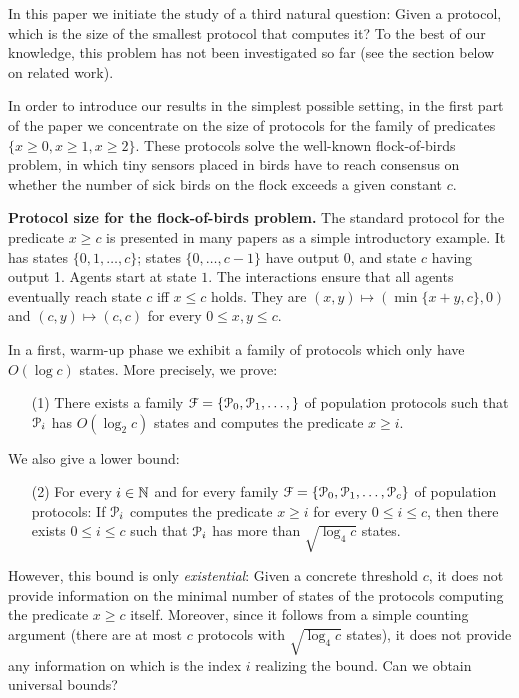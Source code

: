 In this paper we initiate the study of a third natural question: Given
a protocol, which is the size of the smallest protocol that computes
it? To the best of our knowledge, this problem has not been
investigated so far (see the section below on related work).

In order to introduce our results in the simplest possible setting, in
the first part of the paper we concentrate on the size of protocols
for the family of predicates $\{x \geq 0, x \geq 1, x \geq
2 \}$. These protocols solve the well-known flock-of-birds problem, in
which tiny sensors placed in birds have to reach consensus on whether
the number of sick birds on the flock exceeds a given constant $c$.

\medskip\noindent \textbf{Protocol size for the flock-of-birds
  problem.} The standard protocol for the predicate $x \geq c$ is
presented in many papers as a simple introductory example. It has
states $\{0, 1, \ldots, c\}$; states $\{0 , \ldots, c-1\}$ have output
$0$, and state $c$ having output 1. Agents start at state $1$. The
interactions ensure that all agents eventually reach state $c$ if{}f
$x \leq c$ holds. They are $(x, y) \mapsto (\min\{x+y,c\}, 0)$ and
$(c,y) \mapsto (c,c)$ for every $0 \leq x, y \leq c$.

In a first, warm-up phase we exhibit a family of protocols which only
have $O(\log c)$ states. More precisely, we prove:
\begin{itemize}
\item[(1)] There exists a family $\mathcal{F} = \{\mathcal{P}_0, \mathcal{P}_1,
  \ldots, \}$ of population protocols such that $\mathcal{P}_i$ has $O(\log_2
  c)$ states and computes the predicate $x \geq i$.
\end{itemize}
We also give a lower bound:
\begin{itemize}
\item[(2)] For every $i \in \mathbb{N}$ and for every family $\mathcal{F} =
  \{\mathcal{P}_0, \mathcal{P}_1, \ldots, \mathcal{P}_c\}$ of population protocols: If $\mathcal{P}_i$
  computes the predicate $x \geq i$ for every $0 \leq i \leq c$, then
  there exists $0 \leq i \leq c$ such that $\mathcal{P}_i$ has more than
  $\sqrt{\log_4 c}$ states.
\end{itemize}
However, this bound is only \emph{existential}: Given a concrete
threshold $c$, it does not provide information on the minimal number
of states of the protocols computing the predicate $x \geq c$
itself. Moreover, since it follows from a simple counting argument
(there are at most $c$ protocols with $\sqrt{\log_4 c}$ states), it
does not provide any information on which is the index $i$ realizing
the bound. Can we obtain universal bounds?

